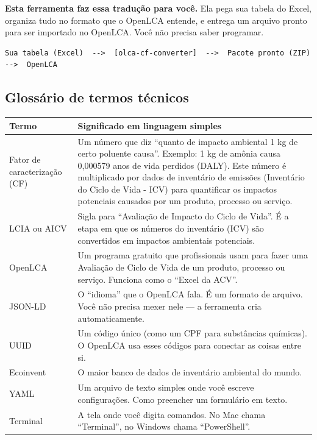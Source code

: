 \textbf{Esta ferramenta faz essa tradu\c{c}\~ao para voc\^e.} Ela pega sua tabela do Excel, organiza tudo no formato que o OpenLCA entende, e entrega um arquivo pronto para ser importado no OpenLCA. Voc\^e n\~ao precisa saber programar.

\begin{lstlisting}[style=bash]
Sua tabela (Excel)  -->  [olca-cf-converter]  -->  Pacote pronto (ZIP)  -->  OpenLCA
\end{lstlisting}

\subsection{Gloss\'ario de termos t\'ecnicos}

\begin{longtable}{p{4cm}p{10cm}}
\toprule
\textbf{Termo} & \textbf{Significado em linguagem simples} \\
\midrule
\endhead
Fator de caracteriza\c{c}\~ao (CF) & Um n\'umero que diz ``quanto de impacto ambiental 1 kg de certo poluente causa''. Exemplo: 1 kg de am\^onia causa 0,000579 anos de vida perdidos (DALY). Este número é multiplicado por dados de inventário de emissões (Inventário do Ciclo de Vida - ICV) para quantificar os impactos potenciais causados por um produto, processo ou serviço. \\
\addlinespace
LCIA ou AICV & Sigla para ``Avalia\c{c}\~ao de Impacto do Ciclo de Vida''. \'E a etapa em que os n\'umeros do invent\'ario (ICV) s\~ao convertidos em impactos ambientais potenciais. \\
\addlinespace
OpenLCA & Um programa gratuito que profissionais usam para fazer uma Avalia\c{c}\~ao de Ciclo de Vida de um produto, processo ou serviço. Funciona como o ``Excel da ACV''. \\
\addlinespace
JSON-LD & O ``idioma'' que o OpenLCA fala. \'E um formato de arquivo. Voc\^e n\~ao precisa mexer nele --- a ferramenta cria automaticamente. \\
\addlinespace
UUID & Um c\'odigo \'unico (como um CPF para subst\^ancias qu\'imicas). O OpenLCA usa esses c\'odigos para conectar as coisas entre si. \\
\addlinespace
Ecoinvent & O maior banco de dados de invent\'ario ambiental do mundo. \\
\addlinespace
YAML & Um arquivo de texto simples onde voc\^e escreve configura\c{c}\~oes. Como preencher um formul\'ario em texto. \\
\addlinespace
Terminal & A tela onde voc\^e digita comandos. No Mac chama ``Terminal'', no Windows chama ``PowerShell''. \\

\end{longtable}

